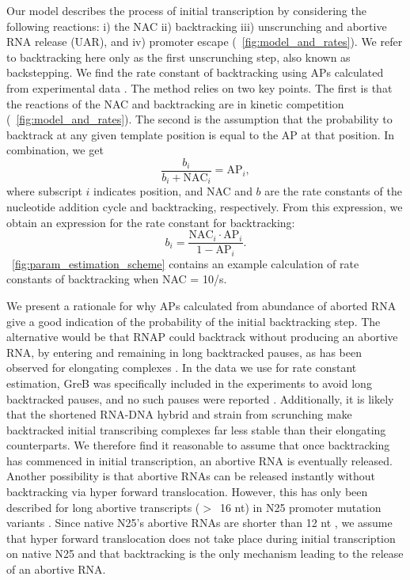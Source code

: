 %
Our model describes the process of initial transcription by considering the
following reactions: i) the NAC ii) backtracking iii) unscrunching and abortive
RNA release (UAR), and iv) promoter escape (\FIG~\ref{fig:model_and_rates}).
We refer to backtracking here only as the first unscrunching step, also known as
backstepping. We find the rate constant of backtracking using APs calculated
from experimental data \cite{hsu_quantitative_1996}. The method relies on two
key points. The first is that the reactions of the NAC and backtracking are in
kinetic competition (\FIG~\ref{fig:model_and_rates}). The second is the
assumption that the probability to backtrack at any given template position is
equal to the AP at that position. In combination, we get
\begin{equation*}
    \frac{b_i}{b_i + \text{NAC}_i} = \text{AP}_i,
\end{equation*}
where subscript $i$ indicates position, and NAC and $b$ are the rate constants
of the nucleotide addition cycle and backtracking, respectively. From this
expression, we obtain an expression for the rate constant for backtracking:
\begin{equation}
  b_i = \frac{\text{NAC}_i\cdot\text{AP}_i}{1-\text{AP}_i}.
  \label{eq:backtrackingcalc}
\end{equation}
\FIG~\ref{fig:param_estimation_scheme} contains an example calculation of rate
constants of backtracking when NAC = 10/s.

We present a rationale for why APs calculated from abundance of aborted RNA
give a good indication of the probability of the initial backtracking step.
The alternative would be that RNAP could backtrack without
producing an abortive RNA, by entering and remaining in long backtracked
pauses, as has been observed for elongating complexes
\cite{shaevitz_backtracking_2003}. In the data we use for rate constant
estimation, GreB was specifically included in the experiments to avoid long
backtracked pauses, and no such pauses were reported
\cite{revyakin_abortive_2006}. Additionally, it is likely that the shortened
RNA-DNA hybrid and strain from scrunching make backtracked initial
transcribing complexes far less stable than their elongating counterparts. We
therefore find it reasonable to assume that once backtracking has commenced in
initial transcription, an abortive RNA is eventually released. Another
possibility is that abortive RNAs can be released instantly without
backtracking via hyper forward translocation. However, this has only been
described for long abortive transcripts ($>$~16 nt) in N25 promoter mutation
variants \cite{chander_alternate_2007, chander_mechanisms_2015}. Since native
N25's abortive RNAs are shorter than 12 nt \cite{chander_alternate_2007}, we
assume that hyper forward translocation does not take place during initial
transcription on native N25 and that backtracking is the only mechanism
leading to the release of an abortive RNA.

